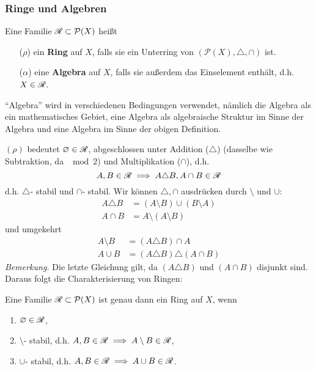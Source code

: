 \subsubsection{Ringe und Algebren}
\begin{definition}
\begin{mdframed}
Eine Familie $\mathscr{R}\subset \mathcal{P}(X)$ heißt
\begin{enumerate}[itemsep=0pt,topsep=3pt]
\item[($\rho$)] ein \textbf{Ring} auf $X$, falls sie ein Unterring von $(\mathcal{P}(X), \triangle, \cap)$ ist.
\item[($\alpha$)] eine \textbf{Algebra} auf $X$, falls sie außerdem das Einselement enthält, d.h. $X \in \mathscr{R}$.
\end{enumerate}
\end{mdframed}
\end{definition}
\begin{remark}
\begin{small}
``Algebra'' wird in verschiedenen Bedingungen verwendet, nämlich die Algebra als ein mathematisches Gebiet, eine Algebra als algebraische Struktur im Sinne der Algebra und eine Algebra im Sinne der obigen Definition.
\end{small}
\end{remark}
$(\rho)$ bedeutet $\varnothing \in \mathscr{R}$, abgeschlossen unter Addition ($\triangle$) (dasselbe wie Subtraktion, da $\mod 2$) und Multiplikation ($\cap$), d.h.
\begin{equation*}
A,B \in \mathscr{R} \implies A\triangle B, A\cap B \in \mathscr{R}
\end{equation*} 
d.h. $\triangle$- stabil und $\cap$- stabil. Wir können $\triangle, \cap$ ausdrücken durch $\setminus$ und $\cup$:
\begin{align*}
A \triangle B & = (A \setminus B) \cup (B \setminus A) \\
A \cap B & = A \setminus (A \setminus B)
\end{align*}
und umgekehrt
\begin{align*}
A \setminus B &= (A \triangle B) \cap A \\
A \cup B &= (A \triangle B) \triangle (A \cap B)
\end{align*}
\textit{Bemerkung.} Die letzte Gleichung gilt, da $(A\triangle B)$ und $(A\cap B)$ disjunkt sind. \newline \newline
Daraus folgt die Charakterisierung von Ringen:
\begin{lemma}
\begin{mdframed}
Eine Familie $\mathscr{R}\subset \mathcal{P}(X)$ ist genau dann ein Ring auf $X$, wenn
\begin{enumerate}[(\roman*), topsep=3pt, itemsep=0pt]
\item $\varnothing \in \mathscr{R}$,
\item $\setminus$- stabil, d.h. $A,B \in \mathscr{R} \implies A \setminus B \in \mathscr{R}$,
\item $\cup$- stabil, d.h. $A, B \in \mathscr{R} \implies A \cup B \in \mathscr{R}$.
\end{enumerate}
\end{mdframed}
\end{lemma}
